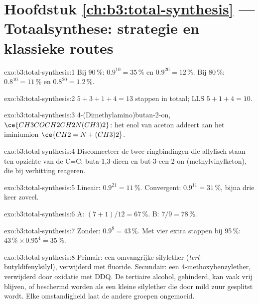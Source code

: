 \section*{Hoofdstuk \ref{ch:b3:total-synthesis} --- Totaalsynthese: strategie en klassieke routes}

\begin{solution}{exo:b3:total-synthesis:1}
Bij 90\,\%: $0.9^{10} = 35$\,\% en $0.9^{20} = 12$\,\%. Bij 80\,\%: $0.8^{10} = 11$\,\% en $0.8^{20} = 1.2$\,\%.
\end{solution}

\begin{solution}{exo:b3:total-synthesis:2}
$5 + 3 + 1 + 4 = 13$ stappen in totaal; LLS $5 + 1 + 4 = 10$.
\end{solution}

\begin{solution}{exo:b3:total-synthesis:3}
4-(Dimethylamino)butan-2-on, $\ce{CH3COCH2CH2N(CH3)2}$: het enol van aceton addeert aan het
iminiumion $\ce{CH2=N+(CH3)2}$.
\end{solution}

\begin{solution}{exo:b3:total-synthesis:4}
Disconnecteer de twee ringbindingen die allylisch staan ten opzichte van
de C=C: buta-1,3-dieen en but-3-een-2-on
(methylvinylketon), die bij verhitting reageren.
\end{solution}

\begin{solution}{exo:b3:total-synthesis:5}
Lineair: $0.9^{21} = 11$\,\%. Convergent: $0.9^{11} = 31$\,\%, bijna drie keer zoveel.
\end{solution}

\begin{solution}{exo:b3:total-synthesis:6}
A: $(7 + 1)/12 = 67$\,\%. B: $7/9 = 78$\,\%.
\end{solution}

\begin{solution}{exo:b3:total-synthesis:7}
Zonder: $0.9^8 = 43$\,\%. Met vier extra stappen bij 95\,\%: $43\,\% \times 0.95^4 = 35$\,\%.
\end{solution}

\begin{solution}{exo:b3:total-synthesis:8}
Primair: een omvangrijke silylether (\textit{tert}-butyldifenylsilyl), verwijderd met fluoride.
Secundair: een 4-methoxybenzylether, verwijderd door oxidatie met DDQ. De
tertiaire alcohol, gehinderd, kan vaak vrij blijven, of beschermd worden
als een kleine silylether die door mild zuur gesplitst wordt. Elke
omstandigheid laat de andere groepen ongemoeid.
\end{solution}

